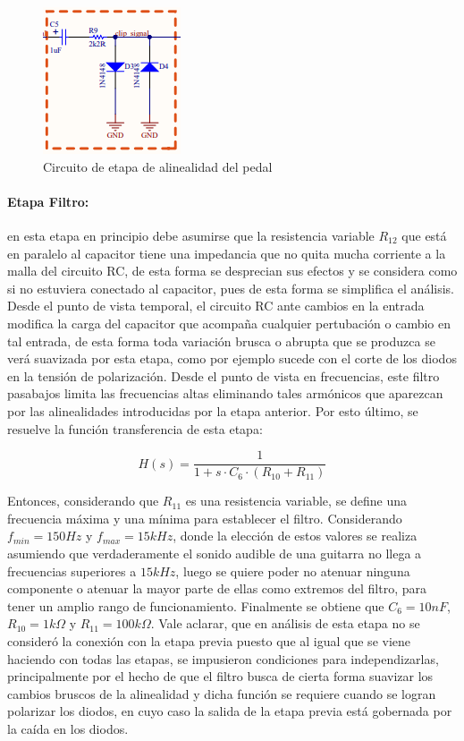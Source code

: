 \begin{figure}[H]
    \centering
    \includegraphics[]{../EJ5/Recursos/circuito_alinealidad.PNG}
    \caption{Circuito de etapa de alinealidad del pedal}
    \label{fig:circuito_alinealidad}
\end{figure}

\paragraph*{Etapa Filtro:} en esta etapa en principio debe asumirse que la resistencia variable $R_{12}$ que est\'a en paralelo al capacitor tiene una impedancia que no quita mucha corriente a la malla del circuito RC, de esta forma se desprecian sus efectos y se considera como si no
estuviera conectado al capacitor, pues de esta forma se simplifica  el an\'alisis. Desde el punto de vista temporal, el circuito RC ante cambios en la entrada modifica la carga del capacitor que acompa\~na cualquier pertubaci\'on o cambio en tal entrada, de esta forma toda
variaci\'on brusca o abrupta que se produzca se ver\'a suavizada por esta etapa, como por ejemplo sucede con el corte de los diodos en la tensi\'on de polarizaci\'on. Desde el punto de vista en frecuencias, este filtro pasabajos limita las frecuencias altas eliminando tales arm\'onicos
que aparezcan por las alinealidades introducidas por la etapa anterior. Por esto \'ultimo, se resuelve la funci\'on transferencia de esta etapa:

\begin{equation}
    H(s) = \frac{1}{1 + s \cdot C_6 \cdot (R_{10} + R_{11})}
\end{equation}

Entonces, considerando que $R_{11}$ es una resistencia variable, se define una frecuencia m\'axima y una m\'inima para establecer el filtro. Considerando $f_{min} = 150Hz$ y $f_{max} = 15kHz$, donde la elecci\'on de estos valores se realiza asumiendo que verdaderamente el sonido audible de una guitarra
no llega a frecuencias superiores a $15kHz$, luego se quiere poder no atenuar ninguna componente o atenuar la mayor parte de ellas como extremos del filtro, para tener un amplio rango de funcionamiento. Finalmente se obtiene que $C_6 = 10nF$, $R_{10} = 1k \Omega$ y $R_{11} = 100k \Omega$. Vale aclarar, que en an\'alisis
de esta etapa no se consider\'o la conexi\'on con la etapa previa puesto que al igual que se viene haciendo con todas las etapas, se impusieron condiciones para independizarlas, principalmente por el hecho de que el filtro busca de cierta forma suavizar los cambios bruscos de la alinealidad y dicha funci\'on se requiere cuando
se logran polarizar los diodos, en cuyo caso la salida de la etapa previa est\'a gobernada por la ca\'ida en los diodos.

